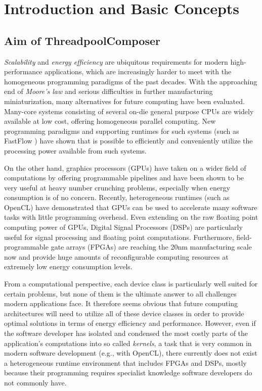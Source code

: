 \section{Introduction and Basic Concepts}\label{sec:overview}%
%
\subsection*{Aim of ThreadpoolComposer}
\emph{Scalability} and \emph{energy efficiency} are ubiquitous requirements for modern high-performance applications, which are increasingly harder to meet with the homogeneous programming paradigms of the past decades.
With the approaching end of \emph{Moore's law} and serious difficulties in further manufacturing miniaturization, many alternatives for future computing have been evaluated.
Many-core systems consisting of several on-die general purpose CPUs are widely available at low cost, offering homogeneous parallel computing.
New programming paradigms and supporting runtimes for such systems (such as FastFlow \cite{fastflow}) have shown that is possible to efficiently and conveniently utilize the processing power available from such systems.

\medskip
On the other hand, graphics processors (GPUs) have taken on a wider field of computations by offering programmable pipelines and have been shown to be very useful at heavy number crunching problems, especially when energy consumption is of no concern.
Recently, heterogeneous runtimes (such as OpenCL) have demonstrated that GPUs can be used to accelerate many software tasks with little programming overhead.
Even extending on the raw floating point computing power of GPUs, Digital Signal Processors (DSPs) are particularly useful for signal processing and floating point computations.
Furthermore, field-programmable gate arrays (FPGAs) are reaching the 20nm manufacturing scale now and provide huge amounts of reconfigurable computing resources at extremely low energy consumption levels.

\medskip
From a computational perspective, each device class is particularly well suited for certain problems, but none of them is the ultimate answer to all challenges modern applications face.
It therefore seems obvious that future computing architectures will need to utilize all of these device classes in order to provide optimal solutions in terms of energy efficiency and performance.
However, even if the software developer has isolated and condensed the most costly parts of the application's computations into so called \emph{kernels}, a task that is very common in modern software development (e.g., with OpenCL), there currently does not exist a heterogeneous runtime environment that includes FPGAs and DSPs, mostly because their programming requires specialist knowledge software developers do not commonly have.

